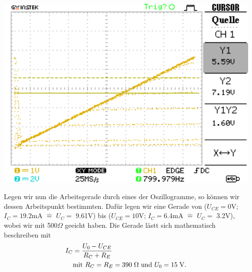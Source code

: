 \documentclass[10pt]{article}
\newenvironment{Figure}
  {\par\medskip\noindent\minipage{\linewidth}}
  {\endminipage\par\medskip}
\begin{document}
\begin{multicols}{2}
\begin{Figure}
		\centering\includegraphics[width=1\textwidth]{../data/Kennlinie4_npn.png}
		\label{fig:1.5}
	\end{Figure}

	Legen wir nun die Arbeitsgerade durch eines der Oszillogramme, so können wir dessen Arbeitspunkt bestimmten. Dafür legen wir eine Gerade von ($U_{CE} = 0$\;V; $I_C = 19.2$\;mA $\hat{=}$ $U_C=$ 9.61\;V) bis ($U_{CE} = 10$\;V; $I_C = 6.4$\;mA $\hat{=}$ $U_C=$ 3.2\;V), wobei wir mit 500\;$\Omega$ geeicht haben. Die Gerade lästt sich mathematisch beschreiben mit
	\begin{align*}
		I_C & = \frac{U_0 - U_{CE}}{R_C + R_E}                                        \\
		    & \text{mit } R_C=R_E=390\text{\;}\Omega \text{ und } U_0 = 15\text{\;V.}
	\end{align*}


\end{multicols}
\end{document}
